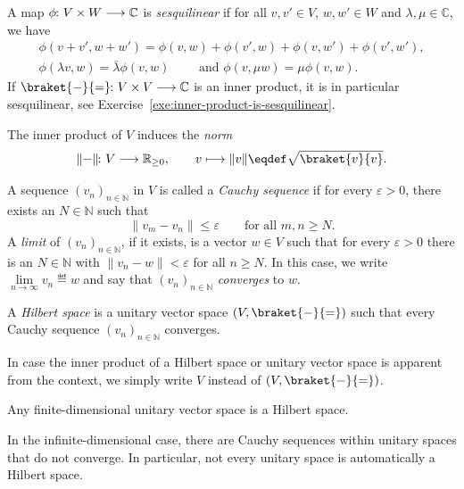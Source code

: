 \documentclass[a4paper, oneside, 12pt]{amsart}
\begin{document}
\begin{remark}\label{rmk:sesquilinear}
  A map \(\phi \from V \times W \to \mathbb{C}\) is \emph{sesquilinear} if for all \(v, v' \in V\), \(w, w' \in W\) and \(\lambda, \mu \in \mathbb{C}\), we have
  \begin{gather*}
    \phi(v+v', w+ w') = \phi(v,w) + \phi(v',w) + \phi(v, w') + \phi(v',w'), \\
    \phi(\lambda v, w) = \overline{\lambda} \phi(v, w) \qquad \text{ and } \phi(v, \mu w) = \mu \phi(v,w).
  \end{gather*}
  If \(\braket{\blank}{\bblank} \from V\times V \to \mathbb{C}\) is an inner product, it is in particular sesquilinear, see Exercise~\ref{exe:inner-product-is-sesquilinear}.
\end{remark}



The inner product of \(V\) induces the \emph{norm}
\begin{equation}
  \| \blank \| \from V \to \mathbb{R}_{\geq0} ,\qquad   v \mapsto \|v\| \eqdef  \sqrt{\braket{v}{v}}.
\end{equation}

A sequence \((v_n)_{n \in \mathbb{N}}\) in \( V \) is called a \emph{Cauchy sequence} if for every \(\varepsilon > 0\), there exists an \(N \in \mathbb{N}\) such that
\begin{equation}
  \|v_m - v_n\| \leq \varepsilon \qquad \text{for all } m, n \geq N.
\end{equation}
A \emph{limit} of \((v_{n})_{n\in \mathbb{N}}\), if it exists, is a vector \(w \in V\) such that for every \(\varepsilon>0\) there is an \(N\in \mathbb{N}\) with
\(\|v_{n}- w\|< \varepsilon\) for all \(n \geq N\).
In this case,  we write \(\lim\limits_{n\to \infty} v_{n} \eqdef w\) and say that \((v_{n})_{n\in \mathbb{N}}\) \emph{converges} to \(w\).

\begin{definition}\label{def:Hilbert-space}
  A \emph{Hilbert space} is a unitary vector space \((V, \braket{\blank}{\bblank})\) such that
  every Cauchy sequence \((v_{n})_{n\in \mathbb{N}}\) converges.
\end{definition}

In case the inner product of a Hilbert space or unitary vector space is apparent from the context, we simply write \(V\) instead of \((V, \braket{ \blank }{\bblank})\).

\begin{proposition}\label{prop:fin-dim-implies-Hilbert}
  Any finite-dimensional unitary vector space is a Hilbert space.
\end{proposition}
In the infinite-dimensional case, there are Cauchy sequences within  unitary spaces that do not converge.
In particular, not every unitary space is automatically a Hilbert space.
\end{document}

